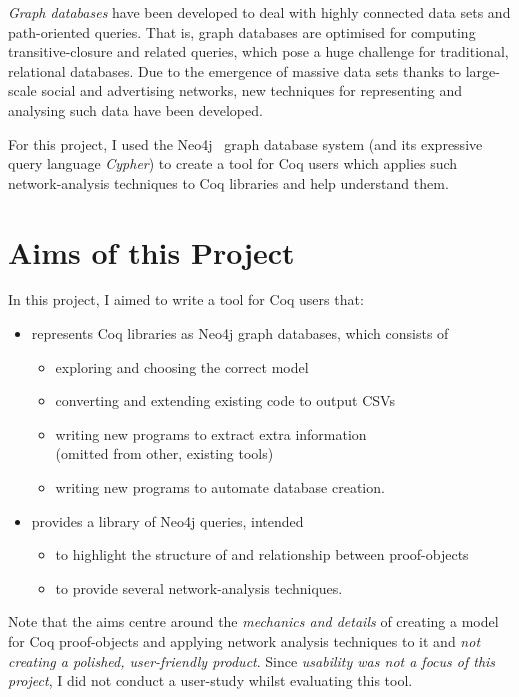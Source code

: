 \emph{Graph databases} have been developed to deal with highly connected data
sets and path-oriented queries. That is, graph databases are optimised for
computing transitive-closure and related queries, which pose a huge challenge
for traditional, relational databases. Due to the emergence of massive data
sets thanks to large-scale social and advertising networks, new techniques for
representing and analysing such data have been developed.

\newpage
For this project, I used the Neo4j~\cite{neo4j} graph database system (and its
expressive query language \emph{Cypher}) to create a tool for Coq users which
applies such network-analysis techniques to Coq libraries and help understand
them.

\section{Aims of this Project}\label{intro:aims}

In this project, I aimed to write a tool for Coq users that:

\begin{itemize}
\item represents Coq libraries as Neo4j graph databases, which consists of
  \begin{itemize}
  \item exploring and choosing the correct model
  \item converting and extending existing code to output CSVs
  \item writing new programs to extract extra information \\
      (omitted from other, existing tools)
  \item writing new programs to automate database creation.
  \end{itemize}

\item provides a library of Neo4j queries, intended
  \begin{itemize}
  \item to highlight the structure of and relationship between proof-objects
  \item to provide several network-analysis techniques.
  \end{itemize}
\end{itemize}

Note that the aims centre around the \emph{mechanics and details} of creating a
model for Coq proof-objects and applying network analysis techniques to it and
\emph{not creating a polished, user-friendly product}. Since \emph{usability was
not a focus of this project}, I did not conduct a user-study whilst evaluating
this tool.


